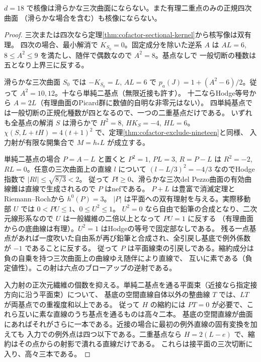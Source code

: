 \begin{theorem}\label{thm:cofactor-eighteen-smooth-cubic}
$d=18$ で核像は滑らかな三次曲面にならない。また有理二重点のみの正規四次曲面
（滑らかな場合を含む）も核像にならない。
\end{theorem}
\begin{proof}
三次または四次なら定理\ref{thm:cofactor-sectional-kernel}から核写像は双有理。
四次の場合、最小解消で $K_{S_0}=0$。固定成分を除いた逆系 $A$ は
$AL=6$, $8\le A^2\le9$ を満たし、随伴で偶数なので $A^2=8$。基点なしで
一般切断の種数は五となり上界三に反する。

滑らかな三次曲面 $S_0$ では $-K_{S_0}=L$, $AL=6$ で
$p_a(J)=1+(A^2-6)/2$。従って $A^2=10,12$。十なら単純二基点（無限近接も許す）。
十二ならHodge等号から $A=2L$（有理曲面のPicard群に数値的自明な非零元はない）。
四単純基点では一般切断の正規化種数が四となるので、一つの二重基点だけである。
いずれも全基点の解消 $S$ は滑らかで $H^2=8$, $HK_S=-4$, $HL=6$。
$\chi(S,L+tH)=4(t+1)^2$ で、定理\ref{thm:cofactor-exclude-nineteen}と同様、
入力射が有限な開集合で $M=h_*L$ が成立する。

単純二基点の場合 $P=A-L$ と置くと $P^2=1$, $PL=3$, $R=P-L$ は
$R^2=-2$, $RL=0$。任意の三次曲面上の直線 $l$ について
$(l-L/3)^2=-4/3$ なのでHodge指数で $|Rl|\le\sqrt{8/3}<2$。
従って $Pl\ge0$、滑らかな三次del Pezzo曲面の有効曲線錐は直線で生成されるので $P$ はnefである。
$P+L$ は豊富で消滅定理とRiemann--Rochから $h^0(P)=3$。
$|P|$ は平面への双有理射を与える。実際移動部 $U$ では $0<PU\le1$、$0\le U^2\le1$。
$U^2=0$ なら自由で鉛筆の合成となり、二次元線形系なので $U$ は一般繊維の二倍以上となって $PU=1$ に反する
（有理曲面からの底曲線は有理）。$U^2=1$ はHodgeの等号で固定部なしである。
残る一点基点があれば一度吹いた自由系が再び鉛筆と合成され、全引戻し基底で例外係数が $-1$ であることに反する。
従って $P$ は平面線束の引戻しである。縮約成分は負の自乗を持つ三次曲面上の曲線ゆえ随伴により直線で、
互いに素である（負定値性）。この射は六点のブローアップの逆射である。

入力射の正次元繊維の個数を抑える。単純二基点を通る平面束（近接なら指定接方向に沿う平面束）について、
基底の空間直線自体以外の整曲線 $T$ では、$LT$ が両基点での重複度和以上である。
従って $H$ の縮約には $PT=0$ が必要で、これら互いに素な直線のうち基点を通るものは高々二本。
基底の空間直線が曲面にあればそれがさらに一本である。近接の場合に最初の例外直線の固有変換を加えても
入力での例外点は四つ以下である。二重基点なら $H=2(L-e)$ で、縮約はその点からの射影で潰れる直線だけである。
これらは接平面の三次切断に入り、高々三本である。
\end{proof}

